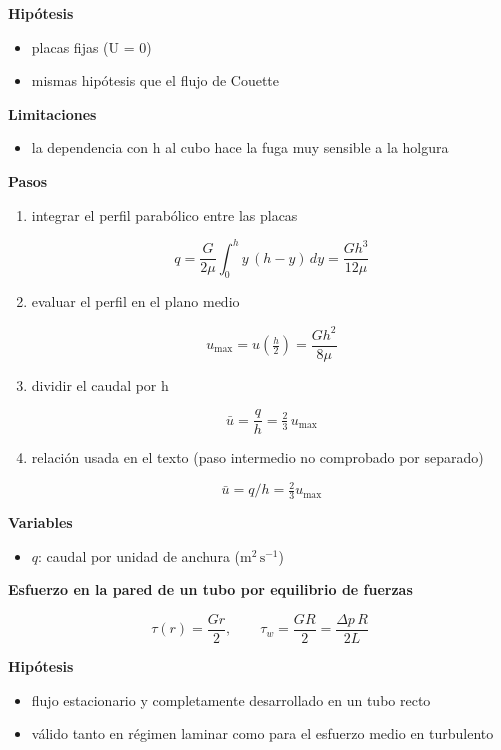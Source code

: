 \documentclass[10pt,openany]{book}
\begin{document}
\begin{tcolorbox}[title={Desarrollos del modelo}, studiumdef, breakable]
\noindent\textbf{Hipótesis}
\begin{itemize}
\item placas fijas (U = 0)
\item mismas hipótesis que el flujo de Couette
\end{itemize}

\noindent\textbf{Limitaciones}
\begin{itemize}
\item la dependencia con h al cubo hace la fuga muy sensible a la holgura
\end{itemize}

\noindent\textbf{Pasos}
\begin{enumerate}
\item
integrar el perfil parabólico entre las placas

\[
q = \frac{G}{2\mu}\int_0^{h} y\,(h - y)\,dy = \frac{G h^{3}}{12\mu}
\]
\item
evaluar el perfil en el plano medio

\[
u_{\max} = u\!\left(\tfrac{h}{2}\right) = \frac{G h^{2}}{8\mu}
\]
\item
dividir el caudal por h

\[
\bar u = \frac{q}{h} = \tfrac{2}{3}\,u_{\max}
\]
\item
relación usada en el texto (paso intermedio no comprobado por separado)

\[
\bar u = q/h = \tfrac{2}{3}u_{\max}
\]
\end{enumerate}

\noindent\textbf{Variables}
\begin{itemize}
\item $q$: caudal por unidad de anchura ($\mathrm{m}^{2}\,\mathrm{s}^{-1}$)
\end{itemize}



\noindent\textbf{Esfuerzo en la pared de un tubo por equilibrio de fuerzas}

\begin{equation}
\tau(r) = \frac{G r}{2},\qquad \tau_w = \frac{G R}{2} = \frac{\Delta p\,R}{2L}
\label{eq:c06-tau-pared}
\end{equation}

\noindent\textbf{Hipótesis}
\begin{itemize}
\item flujo estacionario y completamente desarrollado en un tubo recto
\item válido tanto en régimen laminar como para el esfuerzo medio en turbulento
\end{itemize}


\end{tcolorbox}
\end{document}
